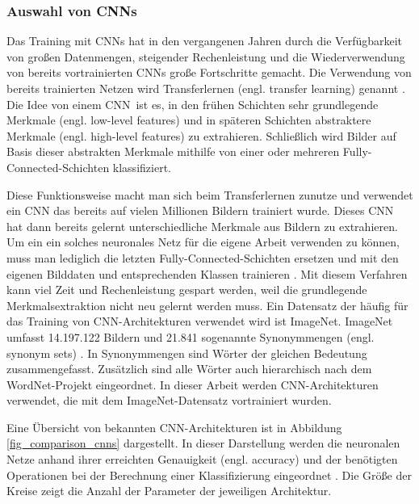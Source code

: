 \subsubsection{Auswahl von \aclp{CNN}}

Das Training mit \acp{CNN} hat in den vergangenen Jahren durch die Verfügbarkeit von großen Datenmengen, steigender Rechenleistung und die Wiederverwendung von bereits vortrainierten \acp{CNN} große Fortschritte gemacht. Die Verwendung von bereits trainierten Netzen wird Transferlernen (engl. transfer learning) genannt \cite{oquab2014transfer}. Die Idee von einem \ac{CNN} ist es, in den frühen Schichten sehr grundlegende Merkmale (engl. low-level features) und in späteren Schichten abstraktere Merkmale (engl. high-level features) zu extrahieren. Schließlich wird Bilder auf Basis dieser abstrakten Merkmale mithilfe von einer oder mehreren Fully-Connected-Schichten klassifiziert.

Diese Funktionsweise macht man sich beim Transferlernen zunutze und verwendet ein \ac{CNN} das bereits auf vielen Millionen Bildern trainiert wurde. Dieses \ac{CNN} hat dann bereits gelernt unterschiedliche Merkmale aus Bildern zu extrahieren. Um ein ein solches neuronales Netz für die eigene Arbeit verwenden zu können, muss man lediglich die letzten Fully-Connected-Schichten ersetzen und mit den eigenen Bilddaten und entsprechenden Klassen trainieren \cite{oquab2014transfer}. Mit diesem Verfahren kann viel Zeit und Rechenleistung gespart werden, weil die grundlegende Merkmalsextraktion nicht neu gelernt werden muss. Ein Datensatz der häufig für das Training von \ac{CNN}-Architekturen verwendet wird ist ImageNet. ImageNet umfasst 14.197.122 Bildern und 21.841 sogenannte Synonymmengen (engl. synonym sets) \cite{deng2009imagenet}. In Synonymmengen sind Wörter der gleichen Bedeutung zusammengefasst. Zusätzlich sind alle Wörter auch hierarchisch nach dem WordNet-Projekt eingeordnet. In dieser Arbeit werden \ac{CNN}-Architekturen verwendet, die mit dem ImageNet-Datensatz vortrainiert wurden.

Eine Übersicht von bekannten \ac{CNN}-Architekturen ist in Abbildung \ref{fig_comparison_cnns} dargestellt. In dieser Darstellung werden die neuronalen Netze anhand ihrer erreichten Genauigkeit (engl. accuracy) und der benötigten Operationen bei der Berechnung einer Klassifizierung eingeordnet \cite{canziani2016analysis}. Die Größe der Kreise zeigt die Anzahl der Parameter der jeweiligen Architektur. 

